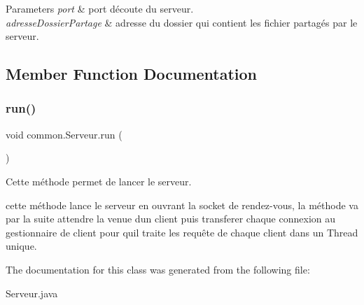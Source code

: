\begin{DoxyParams}{Parameters}
{\em port} & port d\textquotesingle{}écoute du serveur. \\
\hline
{\em adresse\+Dossier\+Partage} & adresse du dossier qui contient les fichier partagés par le serveur. \\
\hline
\end{DoxyParams}


\subsection{Member Function Documentation}
\mbox{\label{classcommon_1_1Serveur_a14bedaf947acad1ebd395abf548b2a98}} 
\subsubsection{\texorpdfstring{run()}{run()}}
{\footnotesize\ttfamily void common.\+Serveur.\+run (\begin{DoxyParamCaption}{ }\end{DoxyParamCaption})\hspace{0.3cm}{\ttfamily [inline]}}



Cette méthode permet de lancer le serveur. 

cette méthode lance le serveur en ouvrant la socket de rendez-\/vous, la méthode va par la suite attendre la venue d\textquotesingle{}un client puis transferer chaque connexion au gestionnaire de client pour qu\textquotesingle{}il traite les requête de chaque client dans un Thread unique. 

The documentation for this class was generated from the following file\+:\begin{DoxyCompactItemize}
\item 
Serveur.\+java\end{DoxyCompactItemize}
